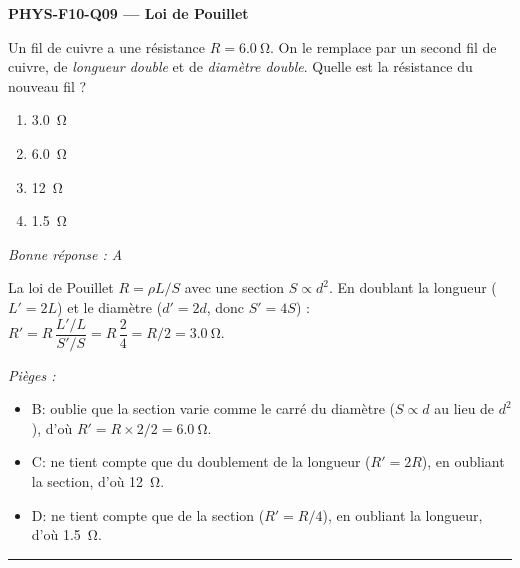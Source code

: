 \documentclass[11pt,a4paper]{article}
\begin{document}
\noindent\textbf{PHYS-F10-Q09 --- Loi de Pouillet}\par
Un fil de cuivre a une résistance $R = \qty{6.0}{\ohm}$. On le remplace par un second fil de cuivre, de \emph{longueur double} et de \emph{diamètre double}. Quelle est la résistance du nouveau fil ?
\begin{enumerate}[label=\Alph*)]
\item \qty{3.0}{\ohm}
\item \qty{6.0}{\ohm}
\item \qty{12}{\ohm}
\item \qty{1.5}{\ohm}
\end{enumerate}
\textit{Bonne réponse : A}\par
La loi de Pouillet $R = \rho L/S$ avec une section $S \propto d^2$. En doublant la longueur ($L' = 2L$) et le diamètre ($d' = 2d$, donc $S' = 4S$) : $R' = R\,\dfrac{L'/L}{S'/S} = R\,\dfrac{2}{4} = R/2 = \qty{3.0}{\ohm}$.\par
\textit{Pièges :}
\begin{itemize}
\item B: oublie que la section varie comme le carré du diamètre ($S\propto d$ au lieu de $d^2$), d'où $R' = R\times2/2 = \qty{6.0}{\ohm}$.
\item C: ne tient compte que du doublement de la longueur ($R' = 2R$), en oubliant la section, d'où \qty{12}{\ohm}.
\item D: ne tient compte que de la section ($R' = R/4$), en oubliant la longueur, d'où \qty{1.5}{\ohm}.
\end{itemize}
\vspace{8pt}\hrule\vspace{8pt}
\end{document}
